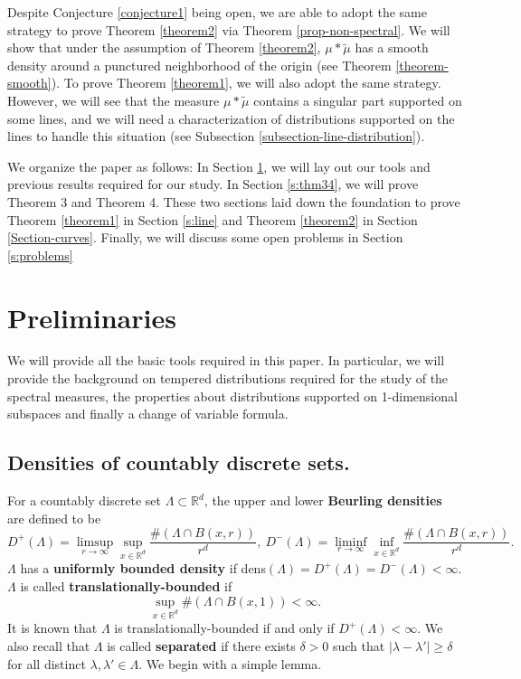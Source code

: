 \documentclass[12pt,a4paper,oneside]{amsart}
\theoremstyle{definition}
\newcommand{\RR}{{\mathbb R}}
\newcommand{\wt}[1]{\widetilde{#1}}
\newcounter{rem}
\begin{document}
Despite Conjecture \ref{conjecture1} being open, we are able to adopt the same strategy to prove Theorem \ref{theorem2} via Theorem \ref{prop-non-spectral}. We will show that under the assumption of Theorem \ref{theorem2}, $\mu\ast\wt\mu$ has a smooth density around a punctured neighborhood of the origin (see Theorem \ref{theorem-smooth}).  To prove Theorem \ref{theorem1}, we will also adopt the same strategy. However, we will see that the measure $\mu\ast\wt{\mu}$ contains a singular part supported on some lines, and we will need a characterization of distributions supported on the lines to handle this situation (see Subsection \ref{subsection-line-distribution}).  


We organize the paper as follows: In Section \ref{s:tool}, we will lay out our tools and previous results required for our study. In Section \ref{s:thm34}, we will prove Theorem 3 and Theorem 4. These two sections laid down the foundation to prove Theorem \ref{theorem1} in Section \ref{s:line} and Theorem \ref{theorem2} in Section \ref{Section-curves}. Finally, we will discuss some open problems in Section \ref{s:problems}


\section{Preliminaries}\label{s:tool}
We will provide all the basic tools required in this paper. In particular, we will provide the background on tempered distributions required for the study of the spectral measures, the properties about distributions supported on 1-dimensional subspaces and finally a change of variable formula. 

\subsection{Densities of countably discrete sets.}   For a countably discrete set $\Lambda\subset \RR^d$, the upper and lower {\bf Beurling densities} {are} defined to be 
$$
D^+(\Lambda) = \limsup_{r\to\infty} \sup_{x\in\RR^d} \frac{\#(\Lambda\cap B(x,r))}{r^d}, \ D^-(\Lambda) = \liminf_{r\to\infty} \inf_{x\in\RR^d} \frac{\#(\Lambda\cap B(x,r))}{r^d}.
$$
 $\Lambda$ has a {\bf uniformly bounded density} if dens$(\Lambda) =D^+(\Lambda) = D^-(\Lambda)<\infty$. $\Lambda$ is called {\bf translationally-bounded} if
 $$\sup_{x\in\RR^d}\#(\Lambda\cap B(x,1))<\infty.$$
 It is known that $\Lambda$ is translationally-bounded if and only if $D^+(\Lambda)<\infty$. 
 We also recall that $\Lambda$ is called {\bf separated} if there exists $\delta>0$ such that $|\lambda-\lambda'|\ge \delta$ for all distinct $\lambda,\lambda'\in\Lambda$. We begin with a simple lemma.
\end{document}
